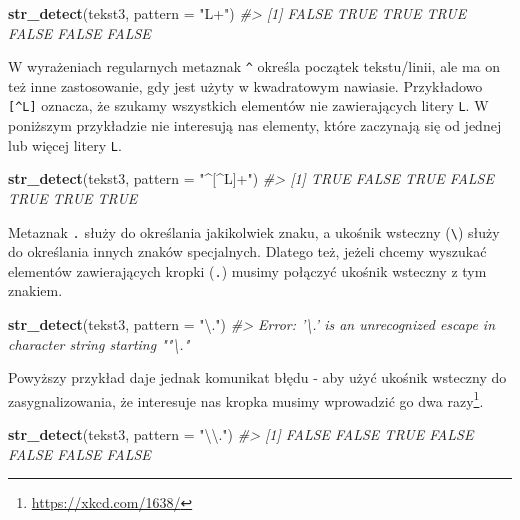 \documentclass[paper=6in:9in,pagesize=pdftex,headinclude=on,footinclude=on,10pt]{scrbook}
\newenvironment{Shaded}{\begin{snugshade}}{\end{snugshade}}
\newcommand{\CharTok}[1]{\textcolor[rgb]{0.31,0.60,0.02}{#1}}
\newcommand{\CommentTok}[1]{\textcolor[rgb]{0.56,0.35,0.01}{\textit{#1}}}
\newcommand{\DataTypeTok}[1]{\textcolor[rgb]{0.13,0.29,0.53}{#1}}
\newcommand{\KeywordTok}[1]{\textcolor[rgb]{0.13,0.29,0.53}{\textbf{#1}}}
\newcommand{\NormalTok}[1]{#1}
\newcommand{\StringTok}[1]{\textcolor[rgb]{0.31,0.60,0.02}{#1}}
\begin{document}
\begin{Shaded}
\begin{Highlighting}[]
\KeywordTok{str_detect}\NormalTok{(tekst3, }\DataTypeTok{pattern =} \StringTok{"L+"}\NormalTok{)}
\CommentTok{#> [1] FALSE  TRUE  TRUE  TRUE FALSE FALSE FALSE}
\end{Highlighting}
\end{Shaded}

W wyrażeniach regularnych metaznak \texttt{\^{}} określa początek tekstu/linii, ale ma on też inne zastosowanie, gdy jest użyty w kwadratowym nawiasie.
Przykładowo \texttt{{[}\^{}L{]}} oznacza, że szukamy wszystkich elementów nie zawierających litery \texttt{L}.
W poniższym przykładzie nie interesują nas elementy, które zaczynają się od jednej lub więcej litery \texttt{L}.

\begin{Shaded}
\begin{Highlighting}[]
\KeywordTok{str_detect}\NormalTok{(tekst3, }\DataTypeTok{pattern =} \StringTok{"^[^L]+"}\NormalTok{)}
\CommentTok{#> [1]  TRUE FALSE  TRUE FALSE  TRUE  TRUE  TRUE}
\end{Highlighting}
\end{Shaded}

Metaznak \texttt{.} służy do określania jakikolwiek znaku, a ukośnik wsteczny (\texttt{\textbackslash{}}) służy do określania innych znaków specjalnych.
Dlatego też, jeżeli chcemy wyszukać elementów zawierających kropki (\texttt{.}) musimy połączyć ukośnik wsteczny z tym znakiem.

\begin{Shaded}
\begin{Highlighting}[]
\KeywordTok{str_detect}\NormalTok{(tekst3, }\DataTypeTok{pattern =} \StringTok{"\textbackslash{}."}\NormalTok{)}
\CommentTok{#> Error: '\textbackslash{}.' is an unrecognized escape in character string starting ""\textbackslash{}."}
\end{Highlighting}
\end{Shaded}

Powyższy przykład daje jednak komunikat błędu - aby użyć ukośnik wsteczny do zasygnalizowania, że interesuje nas kropka musimy wprowadzić go dwa razy\footnote{\url{https://xkcd.com/1638/}}.

\begin{Shaded}
\begin{Highlighting}[]
\KeywordTok{str_detect}\NormalTok{(tekst3, }\DataTypeTok{pattern =} \StringTok{"}\CharTok{\textbackslash{}\textbackslash{}}\StringTok{."}\NormalTok{)}
\CommentTok{#> [1] FALSE FALSE  TRUE FALSE FALSE FALSE FALSE}
\end{Highlighting}
\end{Shaded}
\end{document}
